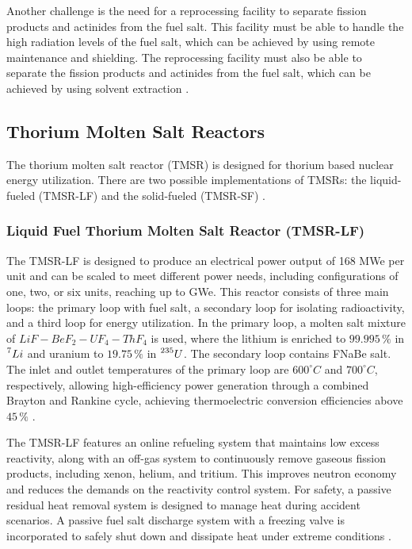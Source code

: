 Another challenge is the need for a reprocessing facility to separate fission products and actinides from the fuel salt. This facility must be able to handle the high radiation levels of the fuel salt, which can be achieved by using remote maintenance and shielding. The reprocessing facility must also be able to separate the fission products and actinides from the fuel salt, which can be achieved by using solvent extraction \cite{TMSR_book}.

\subsection{Thorium Molten Salt Reactors}

The thorium molten salt reactor (TMSR) is designed for thorium based nuclear energy utilization. There are two possible implementations of TMSRs: the liquid-fueled (TMSR-LF) and the solid-fueled (TMSR-SF) \cite{TMSR_book}.

\subsubsection{Liquid Fuel Thorium Molten Salt Reactor (TMSR-LF)}

The TMSR-LF is designed to produce an electrical power output of 168 MWe per unit and can be scaled to meet different power needs, including configurations of one, two, or six units, reaching up to GWe. This reactor consists of three main loops: the primary loop with fuel salt, a secondary loop for isolating radioactivity, and a third loop for energy utilization. In the primary loop, a molten salt mixture of \(LiF-BeF_2-UF_4-ThF_4\) is used, where the lithium is enriched to \(99.995 \, \%\) in \(\prescript{7}{}{Li}\) and uranium to \(19.75 \, \%\) in \(\prescript{235}{}{U}\). The secondary loop contains FNaBe salt. The inlet and outlet temperatures of the primary loop are \(600^{\circ}C\) and \(700^{\circ}C\), respectively, allowing high-efficiency power generation through a combined Brayton and Rankine cycle, achieving thermoelectric conversion efficiencies above \(45 \, \%\) \cite{TMSR_book}.

The TMSR-LF features an online refueling system that maintains low excess reactivity, along with an off-gas system to continuously remove gaseous fission products, including xenon, helium, and tritium. This improves neutron economy and reduces the demands on the reactivity control system. For safety, a passive residual heat removal system is designed to manage heat during accident scenarios. A passive fuel salt discharge system with a freezing valve is incorporated to safely shut down and dissipate heat under extreme conditions \cite{TMSR_book}.

